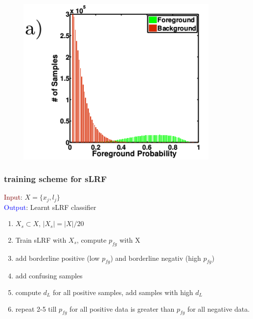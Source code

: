 \documentclass[xcolor=dvipsnames]{beamer}
\begin{document}
\begin{frame}
\frametitle{}

\begin{figure}
\includegraphics[width=10cm]{img/rir_0.png}
\end{figure}
\end{frame}

\begin{frame}
\frametitle{training scheme for sLRF}

\large

\textcolor{Maroon}{Input}: $X = \{x_j, l_j\}$ \\
\textcolor{Blue}{Output}: Learnt sLRF classifier

\begin{enumerate}
	\item $X_s \subset X$, $\lvert X_s \rvert = \lvert X \rvert / 20$
	\item Train sLRF with $X_s$, compute $p_{fg}$ with X
	\item add borderline positive (low $p_{fg}$) and borderline negativ (high $p_{fg}$)
	\item add confusing samples
	\item compute $d_L$ for all positive samples, add samples with high $d_L$
	\item repeat 2-5 till $p_{fg}$ for all positive data is greater than $p_{fg}$ for all negative data.
\end{enumerate}

\end{frame}
\end{document}
